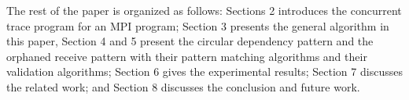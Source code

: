 
The rest of the paper is organized as follows: Sections 2 introduces the concurrent trace program for an MPI program; Section 3 presents the general algorithm in this paper, Section 4 and 5 present the circular dependency pattern and the orphaned receive pattern with their pattern matching algorithms and their validation algorithms; Section 6 gives the experimental results; Section 7 discusses the related work; and Section 8 discusses the conclusion and future work.